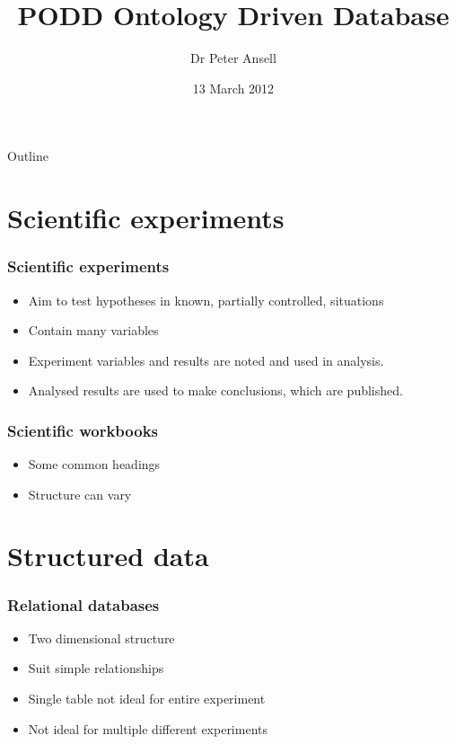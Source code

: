 \documentclass[12pt]{beamer}
\title{PODD Ontology Driven Database}
\author{Dr Peter Ansell}
\institute{University of Queensland}
\date{13 March 2012}
\begin{document}
\begin{frame}
\titlepage
\end{frame}

\begin{frame}{Outline}
  \tableofcontents
\end{frame}

\section{Scientific experiments}

\begin{frame}
\frametitle{Scientific experiments}

\begin{itemize}
 \item Aim to test hypotheses in known, partially controlled, situations
\pause
 \item Contain many variables
\pause
 \item Experiment variables and results are noted and used in analysis.
\pause
 \item Analysed results are used to make conclusions, which are published.
\end{itemize}
\end{frame}

\begin{frame}
\frametitle{Scientific workbooks}

\begin{itemize}
 \item Some common headings
\pause
 \item Structure can vary
\end{itemize}
\end{frame}

\section{Structured data}

\begin{frame}
\frametitle{Relational databases}

\begin{itemize}
 \item Two dimensional structure
\pause
 \item Suit simple relationships
\pause
 \item Single table not ideal for entire experiment
\pause
 \item Not ideal for multiple different experiments
\end{itemize}
\end{frame}
\end{document}
